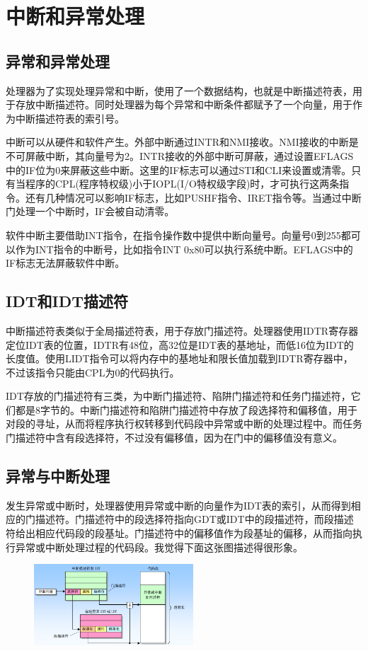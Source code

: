 \documentclass[a4paper,left=2.5cm,right=2.5cm,11pt]{article}
\begin{document}
\tableofcontents

\clearpage

\section{中断和异常处理}
\subsection{异常和异常处理}
处理器为了实现处理异常和中断，使用了一个数据结构，也就是中断描述符表，用于存放中断描述符。同时处理器为每个异常和中断条件都赋予了一个向量，用于作为中断描述符表的索引号。\par
	中断可以从硬件和软件产生。外部中断通过INTR和NMI接收。NMI接收的中断是不可屏蔽中断，其向量号为2。INTR接收的外部中断可屏蔽，通过设置EFLAGS中的IF位为0来屏蔽这些中断。这里的IF标志可以通过STI和CLI来设置或清零。只有当程序的CPL(程序特权级)小于IOPL(I/O特权级字段)时，才可执行这两条指令。还有几种情况可以影响IF标志，比如PUSHF指令、IRET指令等。当通过中断门处理一个中断时，IF会被自动清零。\par
	软件中断主要借助INT指令，在指令操作数中提供中断向量号。向量号0到255都可以作为INT指令的中断号，比如指令INT 0x80可以执行系统中断。EFLAGS中的IF标志无法屏蔽软件中断。\par

\subsection{IDT和IDT描述符}
中断描述符表类似于全局描述符表，用于存放门描述符。处理器使用IDTR寄存器定位IDT表的位置，IDTR有48位，高32位是IDT表的基地址，而低16位为IDT的长度值。使用LIDT指令可以将内存中的基地址和限长值加载到IDTR寄存器中，不过该指令只能由CPL为0的代码执行。\par
	IDT存放的门描述符有三类，为中断门描述符、陷阱门描述符和任务门描述符，它们都是8字节的。中断门描述符和陷阱门描述符中存放了段选择符和偏移值，用于对段的寻址，从而将程序执行权转移到代码段中异常或中断的处理过程中。而任务门描述符中含有段选择符，不过没有偏移值，因为在门中的偏移值没有意义。\par

\subsection{异常与中断处理}
	发生异常或中断时，处理器使用异常或中断的向量作为IDT表的索引，从而得到相应的门描述符。门描述符中的段选择符指向GDT或IDT中的段描述符，而段描述符给出相应代码段的段基址。门描述符中的偏移值作为段基址的偏移，从而指向执行异常或中断处理过程的代码段。我觉得下面这张图描述得很形象。\par
	\begin{figure}[H]
		\center
		\includegraphics[width=0.53\textwidth]{1.png}
	\end{figure}
	
\end{document}
